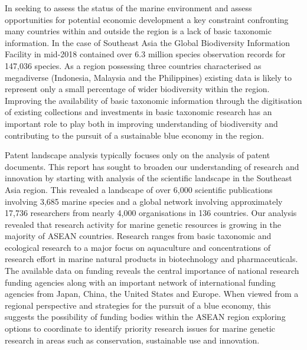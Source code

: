 \documentclass[openany]{book}
\theoremstyle{definition}
\theoremstyle{definition}
\theoremstyle{definition}
\theoremstyle{remark}
\begin{document}
In seeking to assess the status of the marine environment and assess
opportunities for potential economic development a key constraint
confronting many countries within and outside the region is a lack of
basic taxonomic information. In the case of Southeast Asia the Global
Biodiversity Information Facility in mid-2018 contained over 6.3 million
species observation records for 147,036 species. As a region possessing
three countries characterised as megadiverse (Indonesia, Malaysia and
the Philippines) existing data is likely to represent only a small
percentage of wider biodiversity within the region. Improving the
availability of basic taxonomic information through the digitisation of
existing collections and investments in basic taxonomic research has an
important role to play both in improving understanding of biodiversity
and contributing to the pursuit of a sustainable blue economy in the
region.

Patent landscape analysis typically focuses only on the analysis of
patent documents. This report has sought to broaden our understanding of
research and innovation by starting with analysis of the scientific
landscape in the Southeast Asia region. This revealed a landscape of
over 6,000 scientific publications involving 3,685 marine species and a
global network involving approximately 17,736 researchers from nearly
4,000 organisations in 136 countries. Our analysis revealed that
research activity for marine genetic resources is growing in the
majority of ASEAN countries. Research ranges from basic taxonomic and
ecological research to a major focus on aquaculture and concentrations
of research effort in marine natural products in biotechnology and
pharmaceuticals. The available data on funding reveals the central
importance of national research funding agencies along with an important
network of international funding agencies from Japan, China, the United
States and Europe. When viewed from a regional perspective and
strategies for the pursuit of a blue economy, this suggests the
possibility of funding bodies within the ASEAN region exploring options
to coordinate to identify priority research issues for marine genetic
research in areas such as conservation, sustainable use and innovation.
\end{document}
